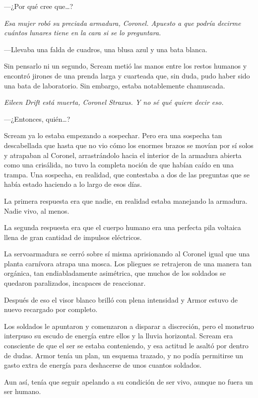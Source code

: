 ---¿Por qué cree que\dots{}?

\emph{Esa mujer robó su preciada armadura, Coronel. Apuesto a que podría decirme cuántos lunares tiene en la cara si se lo preguntara.}

---Llevaba una falda de cuadros, una blusa azul y una bata blanca.

Sin pensarlo ni un segundo, Scream metió las manos entre los restos humanos y encontró jirones de una prenda larga y cuarteada que, sin duda, pudo haber sido una bata de laboratorio. Sin embargo, estaba notablemente chamuscada.

\emph{Eileen Drift está muerta, Coronel Straxus. Y no sé qué quiere decir eso.}

---¿Entonces, quién\dots{}?

Scream ya lo estaba empezando a sospechar. Pero era una sospecha tan descabellada que hasta que no vio cómo los enormes brazos se movían por sí solos y atrapaban al Coronel, arrastrándolo hacia el interior de la armadura abierta como una crisálida, no tuvo la completa noción de que habían caído en una trampa. Una sospecha, en realidad, que contestaba a dos de las preguntas que se había estado haciendo a lo largo de esos días.

La primera respuesta era que nadie, en realidad estaba manejando la armadura. Nadie vivo, al menos.

La segunda respuesta era que el cuerpo humano era una perfecta pila voltaica llena de gran cantidad de impulsos eléctricos.

La servoarmadura se cerró sobre sí misma aprisionando al Coronel igual que una planta carnívora atrapa una mosca. Los pliegues se retrajeron de una manera tan orgánica, tan endiabladamente asimétrica, que muchos de los soldados se quedaron paralizados, incapaces de reaccionar.

Después de eso el visor blanco brilló con plena intensidad y Armor estuvo de nuevo recargado por completo.

Los soldados le apuntaron y comenzaron a disparar a discreción, pero el monstruo interpuso su escudo de energía entre ellos y la lluvia horizontal. Scream era consciente de que el ser se estaba conteniendo, y esa actitud le asaltó por dentro de dudas. Armor tenía un plan, un esquema trazado, y no podía permitirse un gasto extra de energía para deshacerse de unos cuantos soldados.

Aun así, tenía que seguir apelando a su condición de ser vivo, aunque no fuera un ser humano.

